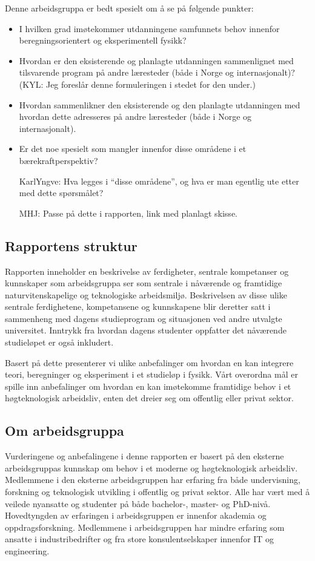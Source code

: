 \documentclass{article}
\begin{document}
Denne arbeidsgruppa er bedt spesielt om å se på følgende punkter:
\begin{itemize}
  \item I hvilken grad imøtekommer utdanningene samfunnets behov innenfor beregningsorientert og eksperimentell fysikk?
  \item {\color{green!50!black}Hvordan er den eksisterende og planlagte utdanningen sammenlignet med tilsvarende program på andre læresteder (både i Norge og internasjonalt)? (KYL: Jeg foreslår denne formuleringen i stedet for den under.)}
  \item {\color{red}Hvordan sammenlikner den eksisterende og den planlagte utdanningen med hvordan dette adresseres på andre læresteder (både i Norge og internasjonalt).}
  \item Er det noe spesielt som mangler innenfor disse områdene i et bærekraftperspektiv?
  
  {\color{red} KarlYngve: Hva legges i ``disse områdene'', og hva er man egentlig ute etter med dette spørsmålet?}

  {\color{yellow!50!black}MHJ: Passe på dette i rapporten, link med planlagt skisse.}
\end{itemize}

\subsection{Rapportens struktur}
Rapporten inneholder en beskrivelse av ferdigheter, sentrale kompetanser og kunnskaper som arbeidsgruppa ser som sentrale i nåværende og framtidige naturvitenskapelige og teknologiske arbeidsmiljø. Beskrivelsen av disse ulike sentrale ferdighetene, kompetansene og kunnskapene  blir deretter satt i sammenheng med  dagens studieprogram og situasjonen ved andre utvalgte universitet. Inntrykk fra hvordan dagens studenter oppfatter det nåværende studieløpet er også inkludert. 

Basert på dette presenterer vi ulike anbefalinger om hvordan en kan integrere teori, beregninger og eksperiment i et studieløp i fysikk. Vårt overordna  mål er spille inn anbefalinger om hvordan en kan  imøtekomme framtidige behov i et høgteknologisk arbeidsliv, enten det dreier seg om  offentlig eller privat sektor. 

\subsection{Om arbeidsgruppa}
Vurderingene og anbefalingene i denne rapporten er basert på den eksterne arbeidsgruppas kunnskap om behov i et moderne og høgteknologisk arbeidsliv.  
Medlemmene i den eksterne arbeidsgruppen har  erfaring fra både undervisning, forskning og teknologisk utvikling i offentlig og privat sektor. Alle har vært med å veilede nyansatte og studenter på både bachelor-, master- og PhD-nivå. Hovedtyngden av erfaringen i arbeidsgruppen er innenfor akademia og oppdragsforskning. Medlemmene i arbeidsgruppen har mindre erfaring som ansatte i industribedrifter og fra store konsulentselskaper innenfor IT og engineering. 
\end{document}
